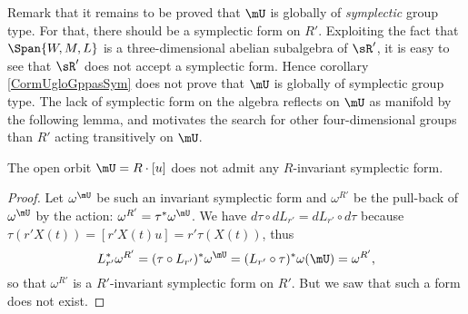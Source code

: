 Remark  that it remains to be proved that $\mU$ is globally of \emph{symplectic} group type. For that, there should be a symplectic form on $R'$. Exploiting the fact that $\Span\{W,M,L \}$ is a three-dimensional abelian subalgebra of $\sR'$, it is easy to see that $\sR'$ does not accept a symplectic form. Hence  corollary  \ref{CormUgloGppasSym} does not prove that $\mU$ is globally of symplectic group type. The lack of symplectic form on the algebra reflects on $\mU$ as manifold by the following lemma, and motivates the search for other four-dimensional groups than $R'$ acting transitively on $\mU$.

\begin{lemma}
The open orbit $\mU=R\cdot [u]$ does not admit any $R$-invariant symplectic form.
\end{lemma}

\begin{proof}
Let $\omega^{\mU}$ be such an invariant symplectic form and $\omega^{R'}$ be the pull-back of $\omega^{\mU}$ by the action: $\omega^{R'}=\tau^*\omega^{\mU}$.
We have $d\tau\circ dL_{r'}=dL_{r'}\circ d\tau$ because $\tau(r'X(t))=[r'X(t)u]=r'\tau(X(t))$, thus
\[ 
  L_{r'}^*\omega^{R'}=(\tau\circ L_{r'})^*\omega^{\mU}=(L_{r'}\circ\tau)^*\omega(\mU)=\omega^{R'},
\]
so that $\omega^{R'}$ is a $R'$-invariant symplectic form on $R'$. But we saw that such a form does not exist.
\end{proof}

